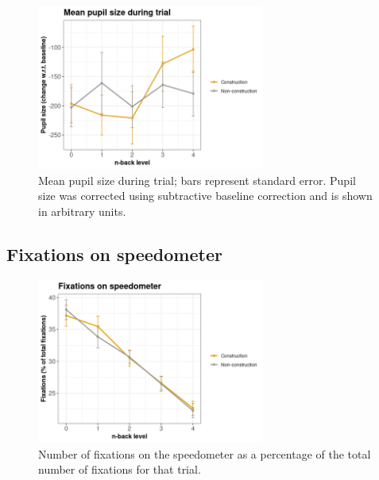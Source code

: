 \begin{figure}[tp]
  \centering
  \includegraphics[width=7.5cm]{images/pupil_size_interaction.png}
  \caption{Mean pupil size during trial; bars represent standard error.
  Pupil size was corrected using subtractive baseline correction and is shown in arbitrary units.}
  \label{fig:mean-ps}
\end{figure}


\subsection{Fixations on speedometer}

\begin{figure}[tp]
  \centering
  \includegraphics[width=7.5cm]{images/speedometer_interaction.png}
  \caption{Number of fixations on the speedometer as a percentage of the total number of fixations for that trial.}
  \label{fig:fix-speedometer}
\end{figure}